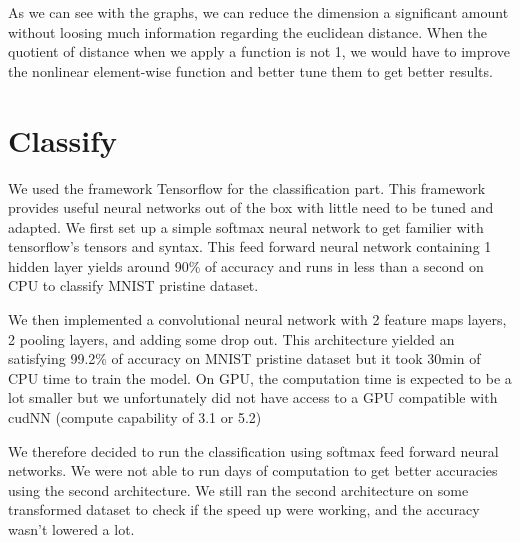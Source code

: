 \documentclass[11pt,a4paper]{article}
\begin{document}
	
%	
	
%	

	As we can see with the graphs, we can reduce the dimension a significant amount without loosing much information regarding the euclidean distance. When the quotient of distance when we apply a function is not 1, we would have to improve the nonlinear element-wise function and better tune them to get better results. 
	
	
	\section{Classify}
	
	We used the framework Tensorflow for the classification part. This framework provides useful neural networks out of the box with little need to be tuned and adapted. We first set up a simple softmax neural network to get familier with tensorflow's tensors and syntax. This feed forward neural network containing 1 hidden layer yields around 90\% of accuracy and runs in less than a second on CPU to classify MNIST pristine dataset.
	
	
	We then implemented a convolutional neural network with 2 feature maps layers, 2 pooling layers, and adding some drop out. This architecture yielded an satisfying 99.2\% of accuracy on MNIST pristine dataset but it took 30min of CPU time to train the model. On GPU, the computation time is expected to be a lot smaller but we unfortunately did not have access to a GPU compatible with cudNN (compute capability of 3.1 or 5.2)
	
	
	We therefore decided to run the classification using softmax feed forward neural networks. We were not able to run days of computation to get better accuracies using the second architecture. We still ran the second architecture on some transformed dataset to check if the speed up were working, and the accuracy wasn't lowered a lot. 
	
\end{document}
